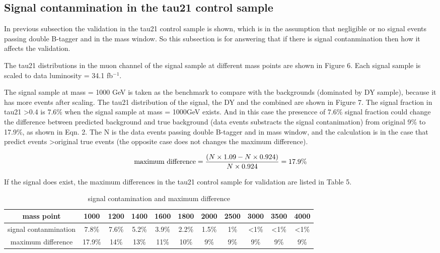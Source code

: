 \documentclass{article}
\begin{document}
\subsection{Signal contanmination in the tau21 control sample}

In previous subsection the validation in the tau21 control sample is shown, which is in the assumption that negligible or no signal events passing double B-tagger and in the mass window. So this subsection is for answering that if there is signal contanmination then how it affects the validation.   

The tau21 distributions in the muon channel of the signal sample at different mass points are shown in Figure 6. Each signal sample is scaled to data luminosity = 34.1 fb$^{-1}$.  

The signal sample at mass = 1000 GeV is taken as the benchmark to compare with the backgrounds (dominated by DY sample), because it has more events after scaling. The tau21 distribution of the signal, the DY and the combined are shown in Figure 7. The signal fraction in tau21 \textgreater 0.4 is 7.6\% when the signal sample at mass = 1000GeV exists. And in this case the presencce of 7.6\% signal fraction could change the difference between predicted background and true background (data events substracts the signal contanimation) from original 9\% to 17.9\%, as shown in Eqn. 2. The N is the data events passing double B-tagger and in mass window, and the calculation is in the case that predict events \textgreater original true events (the opposite case does not changes the maximum difference).

\begin{equation}
\textup{maximum difference}=\frac{(N\times 1.09-N\times 0.924)}{N\times 0.924}=17.9\%
\end{equation}


If the signal does exist, the  maximum differences in the tau21 control sample for validation are listed in Table 5. 


\begin{table}[]
\caption{signal contamination and maximum difference}
\label{my-label}
\centering
\setlength{\tabcolsep}{8pt}
\begin{tabular}{ c | c c c c c c c c c c}
mass point            & 1000  & 1200  & 1400  & 1600  & 1800  & 2000  & 2500 & 3000         & 3500         & 4000         \\
\hline
signal contanmination & 7.8\% & 7.6\% & 5.2\% & 3.9\% & 2.2\% & 1.5\% & 1\%  & \textless1\% & \textless1\% & \textless1\% \\ 
\hline
maximum difference    & 17.9\%  & 14\%  & 13\%  & 11\%  & 10\%  & 9\%   & 9\%  & 9\%          & 9\%          & 9\%          \\

\end{tabular}
\end{table}
\end{document}
